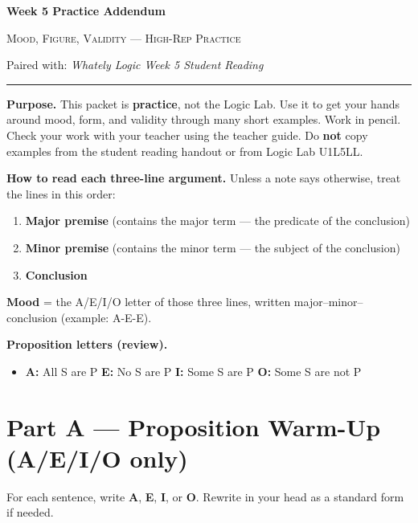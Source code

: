 \documentclass[11pt]{article}
\begin{document}
\begin{center}
{\LARGE\bfseries Week 5 Practice Addendum}\par\vspace{0.05em}
{\large\scshape Mood, Figure, Validity --- High-Rep Practice}\par\vspace{0.08em}
{\small Paired with: \textit{Whately Logic Week 5 Student Reading}}\par\vspace{0.08em}
\rule{0.82\textwidth}{0.5pt}
\end{center}

\noindent\textbf{Purpose.}
This packet is \textbf{practice}, not the Logic Lab. Use it to get your hands around mood, form, and validity through many short examples. Work in pencil. Check your work with your teacher using the teacher guide. Do \textbf{not} copy examples from the student reading handout or from Logic Lab U1L5LL.

\vspace{0.2em}
\noindent\textbf{How to read each three-line argument.}
Unless a note says otherwise, treat the lines in this order:
\begin{enumerate}[label=\arabic*., leftmargin=1.6em, itemsep=0.05em]
\item \textbf{Major premise} (contains the major term --- the predicate of the conclusion)
\item \textbf{Minor premise} (contains the minor term --- the subject of the conclusion)
\item \textbf{Conclusion}
\end{enumerate}
\textbf{Mood} = the A/E/I/O letter of those three lines, written major--minor--conclusion (example: A-E-E).

\vspace{0.15em}
\noindent\textbf{Proposition letters (review).}
\begin{itemize}
\item \textbf{A:} All S are P \quad \textbf{E:} No S are P \quad \textbf{I:} Some S are P \quad \textbf{O:} Some S are not P
\end{itemize}

\section*{Part A --- Proposition Warm-Up (A/E/I/O only)}
\noindent For each sentence, write \textbf{A}, \textbf{E}, \textbf{I}, or \textbf{O}. Rewrite in your head as a standard form if needed.
\end{document}

